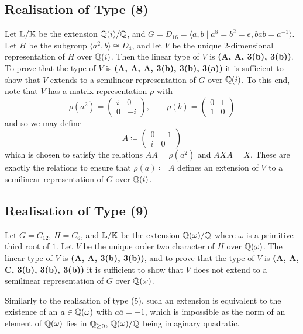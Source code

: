 \subsection{Realisation of Type (8)}

Let ${\mathbb L} / {\mathbb K}$ be the extension ${\mathbb Q}(i) / {\mathbb Q}$, and $G = D_{16} = \langle a,b \mid a^8 = b^2 = e, bab = a^{-1} \rangle$. Let $H$ be the subgroup $\langle a^2, b \rangle \cong D_4$, and let $V$ be the unique $2$-dimensional representation of $H$ over ${\mathbb Q}(i)$. Then the linear type of $V$ is \textbf{(A, A, 3(b), 3(b))}. To prove that the type of $V$ is \textbf{(A, A, A, 3(b), 3(b), 3(a))} it is sufficient to show that $V$ extends to a semilinear representation of $G$ over ${\mathbb Q}(i)$. To this end, note that $V$ has a matrix representation $\rho$ with
\[
\rho(a^2) = \begin{pmatrix}
    i & 0 \\ 0 & -i
\end{pmatrix}, \qquad \rho(b) = \begin{pmatrix}
    0 & 1 \\ 1 & 0
\end{pmatrix}
\]
and so we may define
\[
A \coloneqq \begin{pmatrix}
    0 & -1 \\ i & 0
\end{pmatrix}
\]
which is chosen to satisfy the relations $A \overline{A} = \rho(a^2)$ and $A \overline{X} \overline{A} = X$. These are exactly the relations to ensure that $\rho(a) \coloneqq A$ defines an extension of $V$ to a semilinear representation of $G$ over ${\mathbb Q}(i)$.

\subsection{Realisation of Type (9)} Let $G = C_{12}$, $H = C_6$, and ${\mathbb L} / {\mathbb K}$ be the extension ${\mathbb Q}(\omega) / {\mathbb Q}$ where $\omega$ is a primitive third root of $1$. Let $V$ be the unique order two character of $H$ over ${\mathbb Q}(\omega)$. The linear type of $V$ is \textbf{(A, A, 3(b), 3(b))}, and to prove that the type of $V$ is \textbf{(A, A, C, 3(b), 3(b), 3(b))} it is sufficient to show that $V$ does not extend to a semilinear representation of $G$ over ${\mathbb Q}(\omega)$.

Similarly to the realisation of type (5), such an extension is equivalent to the existence of an $a \in {\mathbb Q}(\omega)$ with $a \overline{a} = -1$, which is impossible as the norm of an element of ${\mathbb Q}(\omega)$ lies in ${\mathbb Q}_{\geq 0}$, ${\mathbb Q}(\omega) / {\mathbb Q}$ being imaginary quadratic.

